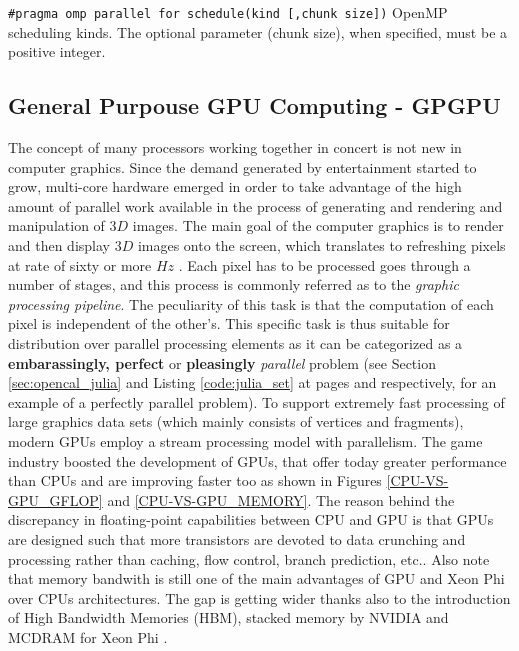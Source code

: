 \begin{description}
\begin{table}
    	\caption[OpenMP scheduling policies]{\texttt{\#pragma omp parallel for schedule(kind [,chunk size])} OpenMP scheduling kinds. The optional parameter (chunk size), when specified, must be a positive integer. }
    	\label{tab:scheduling_policies}
    \end{table}
    
    \subsection{General Purpouse GPU Computing - GPGPU}
    The concept of many processors working together in concert is not new in computer graphics. Since the demand generated by entertainment started to grow, multi-core hardware emerged in order to take advantage of the high amount of parallel work available in the process of generating and rendering and manipulation of $3D$ images.
    The main goal of the computer graphics is to render and then display $3D$ images onto the screen, which translates to refreshing pixels at rate of sixty or more $\si{Hz}$ \cite{Akenine-Moller:2002:RR:553838}.
    Each pixel has to be processed goes through a number of stages, and this process is commonly referred as to the \emph{graphic processing pipeline}.
    The peculiarity of this task is that the computation of each pixel is independent of the other's.
    This specific task is thus suitable for distribution over parallel processing elements as it can be categorized as  a \textbf{embarassingly, perfect} or \textbf{pleasingly} \textit{parallel} problem\cite{Foster:1995:DBP:527029} (see Section \ref{sec:opencal_julia} and Listing \ref{code:julia_set} at pages \pageref{sec:opencal_julia} and \pageref{code:julia_set} respectively, for an example of a perfectly parallel problem).
    To support extremely fast processing of large graphics data sets (which mainly consists of vertices and fragments), modern GPUs employ a stream processing model with parallelism.
    The game industry boosted the development of  GPUs, that offer today greater performance than CPUs and are improving faster too as shown in Figures  \ref{CPU-VS-GPU_GFLOP} and \ref{CPU-VS-GPU_MEMORY}.
    The reason behind the discrepancy in floating-point capabilities between CPU and  GPU is that GPUs are designed such that more transistors are devoted to data crunching and processing rather than caching, flow control, branch prediction, etc..
    Also note that memory bandwith is still one of the main advantages of GPU and Xeon Phi over CPUs architectures. The gap is getting wider thanks also to the introduction of High Bandwidth Memories (HBM), stacked memory by NVIDIA and MCDRAM for Xeon Phi \cite{Sodani:7477467,Jun:7939084}. 

\end{description}
